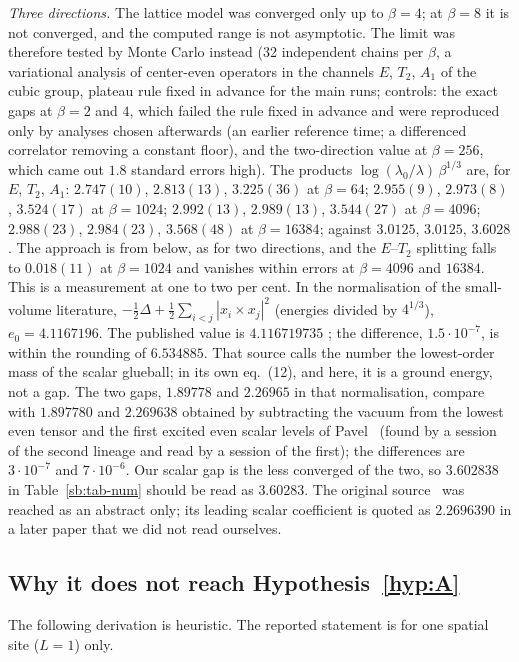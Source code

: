 \emph{Three directions.} The lattice model was converged only up to $\beta=4$; at $\beta=8$ it is not
converged, and the computed range is not asymptotic. The limit was therefore tested by Monte Carlo instead (32 independent chains per $\beta$, a variational analysis of center-even operators in the channels $E$, $T_2$, $A_1$ of the cubic group, plateau rule fixed in advance for the main runs; controls: the exact gaps at $\beta=2$ and $4$, which failed the rule fixed in advance and were reproduced only by analyses chosen afterwards (an earlier reference time; a differenced correlator removing a constant floor), and the two-direction value at $\beta=256$, which came out $1.8$ standard errors high). The products $\log(\lambda_0/\lambda)\,\beta^{1/3}$ are, for $E$, $T_2$, $A_1$: $2.747(10)$, $2.813(13)$, $3.225(36)$ at $\beta=64$; $2.955(9)$, $2.973(8)$, $3.524(17)$ at $\beta=1024$; $2.992(13)$, $2.989(13)$, $3.544(27)$ at $\beta=4096$; $2.988(23)$, $2.984(23)$, $3.568(48)$ at $\beta=16384$; against $3.0125$, $3.0125$, $3.6028$. The approach is from below, as for two directions, and the $E$--$T_2$ splitting falls to $0.018(11)$ at $\beta=1024$ and vanishes within errors at $\beta=4096$ and $16384$. This is a measurement at one to two per cent.
In the normalisation of the small-volume literature, $-\tfrac12\Delta+\tfrac12\sum_{i<j}|x_i\times x_j|^2$
(energies divided by $4^{1/3}$), $e_0=4.1167196$. The published value is $4.116719735$
\cite[text after eq.~(12)]{vB00}; the difference, $1.5\cdot10^{-7}$, is within the rounding of
$6.534885$. That source calls the number the lowest-order mass of the scalar glueball; in its own
eq.~(12), and here, it is a ground energy, not a gap. The two gaps, $1.89778$ and $2.26965$ in that
normalisation, compare with $1.897780$ and $2.269638$ obtained by subtracting the vacuum from the lowest
even tensor and the first excited even scalar levels of Pavel~\cite[Tables~1 and~2]{Pa07} (found by a session
of the second lineage and read by a session of the first); the differences are $3\cdot10^{-7}$ and
$7\cdot10^{-6}$. Our scalar gap is the less converged of the two, so $3.602838$ in Table~\ref{sb:tab-num} should
be read as $3.60283$. The original source~\cite{LM84} was reached as an abstract only; its leading scalar
coefficient is quoted as $2.2696390$ in a later paper that we did not read ourselves.

\subsection{Why it does not reach Hypothesis~\ref{hyp:A}}\label{sb:sub-why}
The following derivation is heuristic. The reported statement is for one spatial site ($L=1$) only.

